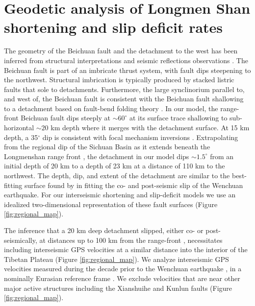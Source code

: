\documentclass[12pt]{article}
\begin{document}
\section{Geodetic analysis of Longmen Shan shortening and slip deficit rates}
The geometry of the Beichuan fault and the detachment to the west has been inferred from structural interpretations \citep{Hubbard2010} and seismic reflections observations \citep{Zhang2009, Guo2013}. The Beichuan fault is part of an imbricate thrust system, with fault dips steepening to the northwest. Structural imbrication is typically produced by stacked listric faults that sole to detachments. Furthermore, the large synclinorium parallel to, and west of, the Beichuan fault is consistent with the Beichuan fault shallowing to a detachment based on fault-bend folding theory \citep{Hubbard2010, Suppe1983}. In our model, the range-front Beichuan fault dips steeply at ${\sim}60^{\circ}$ at its surface trace shallowing to sub-horizontal ${\sim}20$ km depth where it merges with the detachment surface. At 15 km depth, a 35$^{\circ}$ dip is consistent with focal mechanism inversions \citep{Hubbard2010}. Extrapolating from the regional dip of the Sichuan Basin as it extends beneath the Longmenshan range front \citep{Hubbard2010, Guo2013}, the detachment in our model dips ${\sim}1.5^{\circ}$ from an initial depth of 20 km to a depth of 23 km at a distance of 110 km to the northwest. The depth, dip, and extent of the detachment are similar to the best-fitting surface found by \citet{Qi2011} in fitting the co- and post-seismic slip of the Wenchuan earthquake. For our interseismic shortening and slip-deficit models we use an idealized two-dimensional representation of these fault surfaces (Figure \ref{fig:regional_map}).

The inference that a 20 km deep detachment slipped, either co- or post-seismically, at distances up to 100 km from the range-front \citep{Qi2011}, necessitates including interseismic GPS velocities at a similar distance into the interior of the Tibetan Plateau (Figure \ref{fig:regional_map}). We analyze interseismic GPS velocities measured during the decade prior to the Wenchuan earthquake \citep{gan07}, in a nominally Eurasian reference frame \citep{apel06}. We exclude velocities that are near other major active structures including the Xianshuihe and Kunlun faults (Figure \ref{fig:regional_map}). 
\end{document}

